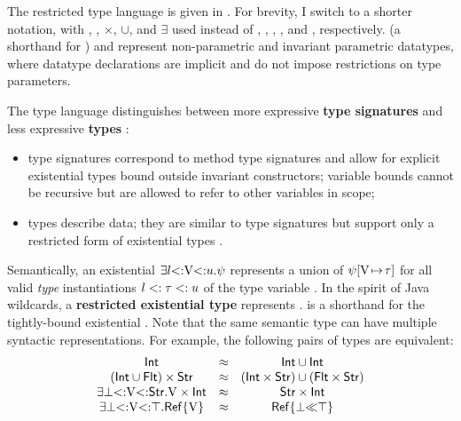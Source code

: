 The restricted type language is given in .
For brevity, I switch to a shorter notation, with \tyany, \tybot, 
$\times$, $\cup$, and $\exists$ used instead of
, , , , and ,
respectively. \iname (a shorthand for \tyinv\iname{}) and 
\tyinv\iname{\ldots} represent
non-parametric and invariant parametric datatypes, where datatype
declarations are implicit and do not impose restrictions on type parameters.

The type language distinguishes between more expressive
\textbf{type signatures} \tysig
and less expressive \textbf{types} \ty:
\begin{itemize}
    \item type signatures \tysig correspond to method type signatures
      and allow for explicit existential types bound outside
      invariant constructors; variable bounds cannot be recursive but are
      allowed to refer to other variables in scope;
    \item types \ty describe data; they are similar to type signatures
      but support only a restricted form of existential types
      \tyinv\iname\rexvars.
\end{itemize}
Semantically, an existential $\exists l{\operatorname{<:}}\mathrm{V}{\operatorname{<:}}u.\psi$ 
represents a union of $\psi[\mathrm{V}\!\mapsto\!\tau]$ for all valid
\emph{type} instantiations $l <: \tau <: u$ of the type variable \vany.
In the spirit of Java wildcards, a \textbf{restricted existential type} 
\tyinv{} %
represents
.
\tyinv{} is a shorthand for the tightly-bound existential
\tyinv{}.
Note that the same semantic type can have multiple syntactic representations.
For example, the following pairs of types are equivalent:
\[
\begin{array}{ccc}
    \mathsf{Int} &\approx& 
        \mathsf{Int} \cup \mathsf{Int} \\
    (\mathsf{Int} \cup \mathsf{Flt}) \times \mathsf{Str} &\approx&
        (\mathsf{Int} \times \mathsf{Str}) \cup (\mathsf{Flt} \times \mathsf{Str}) \\
    \exists\bot{\operatorname{<:}}\mathrm{V}{\operatorname{<:}}\mathsf{Str}.\mathrm{V} \times \mathsf{Int} &\approx& 
        \mathsf{Str} \times \mathsf{Int} \\
    \exists\bot{\operatorname{<:}}\mathrm{V}{\operatorname{<:}}\top.\mathsf{Ref}\{\mathrm{V}\} &\approx&
        \mathsf{Ref}\{\bot{\operatorname{\ll}}\top\} \\
\end{array}
\]

